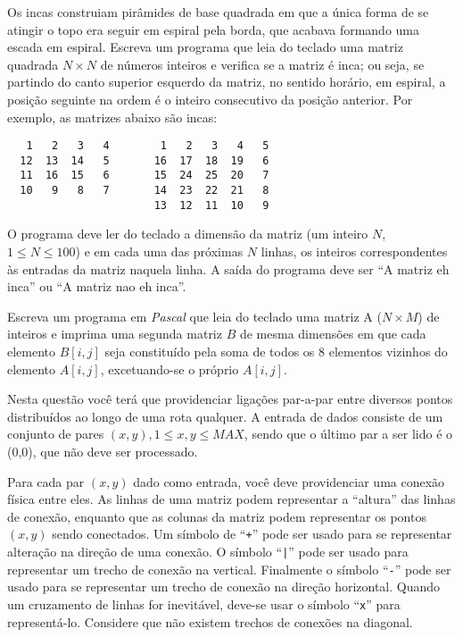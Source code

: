 \item Os incas construiam pirâmides de base quadrada em
que a única forma de se atingir o topo era seguir em espiral pela
borda, que acabava formando uma escada em espiral.  Escreva um
programa que leia do teclado uma matriz quadrada $N \times N$ de
números inteiros e verifica se a matriz é inca; ou seja, se partindo
do canto superior esquerdo da matriz, no sentido horário, em espiral,
a posição seguinte na ordem é o inteiro consecutivo da posição
anterior.  Por exemplo, as matrizes abaixo são incas:

\begin{verbatim}
   1   2   3   4        1   2   3   4   5
  12  13  14   5       16  17  18  19   6        
  11  16  15   6       15  24  25  20   7
  10   9   8   7       14  23  22  21   8
                       13  12  11  10   9
\end{verbatim}

O programa deve ler do teclado a dimensão da matriz 
(um inteiro $N$, $1 \leq N \leq 100$) e em cada uma das próximas $N$ linhas, 
os inteiros correspondentes às  entradas da matriz naquela linha.  
A saída do programa deve ser
``A matriz eh inca'' ou ``A matriz nao eh inca''.

\item Escreva um programa em \emph{Pascal} que leia do teclado uma matriz A 
($N \times M$)
de inteiros e imprima uma segunda matriz $B$ de mesma dimensões em que
cada elemento $B[i,j]$ seja constituído pela soma de todos os 8 elementos
vizinhos do elemento $A[i,j]$, excetuando-se o próprio $A[i,j]$.


\item Nesta questão você terá que providenciar ligações par-a-par 
entre diversos pontos distribuídos ao longo de uma rota qualquer.
A entrada de dados consiste de um conjunto de pares $(x,y), 1\leq x,y \leq
MAX$, sendo
que o último par a ser lido é o (0,0), que não deve ser processado.

Para cada par $(x,y)$ dado como entrada, você deve providenciar uma
conexão física entre eles. 
As linhas de uma matriz podem representar a ``altura'' das
linhas de conexão, enquanto que as colunas da matriz podem representar
os pontos $(x,y)$ sendo conectados. Um símbolo de ``\verb#+#'' pode ser 
usado para se representar alteração na direção de uma conexão. 
O símbolo ``\verb#|#'' pode ser usado para representar um trecho de 
conexão na vertical. Finalmente o símbolo ``\verb#-#'' pode ser usado
para se representar um trecho de conexão na direção horizontal.
Quando um cruzamento de linhas for inevitável, deve-se usar o
símbolo ``\verb#x#'' para representá-lo. Considere que não existem trechos 
de conexões na diagonal.

